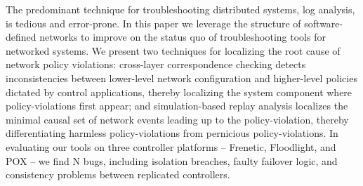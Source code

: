 The predominant technique for troubleshooting distributed systems,
log analysis, is tedious and error-prone. In this paper we leverage the
structure of software-defined networks to
improve on the status quo of troubleshooting tools for networked systems.
We present two techniques for localizing the root cause of network policy
violations: cross-layer correspondence checking detects inconsistencies between lower-level
network configuration and higher-level policies dictated by control
applications, thereby localizing the system component where policy-violations first
appear; and \newline{} simulation-based replay analysis localizes the minimal causal set of network events
leading up to the policy-violation, thereby differentiating harmless
policy-violations from pernicious policy-violations. In evaluating our tools on
three controller platforms -- Frenetic, Floodlight, and POX -- we find N bugs,
including isolation breaches,
faulty failover logic, and consistency problems between replicated
controllers.


